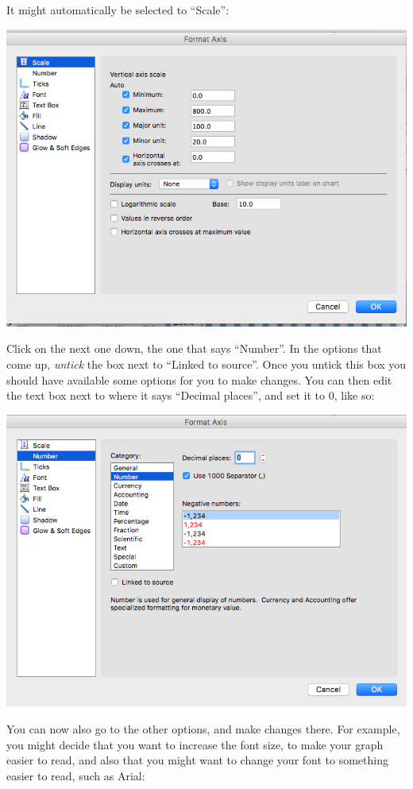 \documentclass[
]{book}
\begin{document}
It might automatically be selected to ``Scale'':

\includegraphics{imgs/desc_viz_7.png}

Click on the next one down, the one that says ``Number''. In the options that come up, \emph{untick} the box next to ``Linked to source''. Once you untick this box you should have available some options for you to make changes. You can then edit the text box next to where it says ``Decimal places'', and set it to 0, like so:

\includegraphics{imgs/desc_viz_8.png}

You can now also go to the other options, and make changes there. For example, you might decide that you want to increase the font size, to make your graph easier to read, and also that you might want to change your font to something easier to read, such as Arial:
\end{document}
